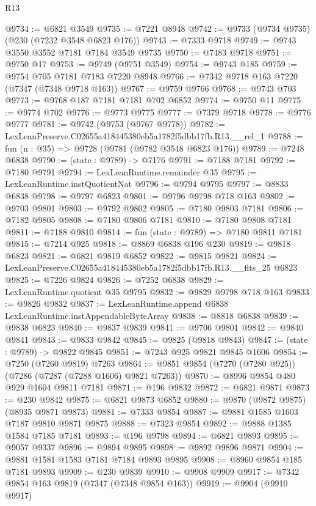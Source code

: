 \begin{lexlean}{R13}
\begin{coremodule}
@9734 := @6821 @3549
@9735 := @7221 @8948
@9742 := @9733 (@9734 @9735) (@230 (@7232 @3548 @6823 @176))
@9743 := @7333 @9718
@9749 := @9743 @3550 @3552 @7181 @7184 @3549 @9735
@9750 := @7483 @9718
@9751 := @9750 @17
@9753 := @9749 (@9751 @3549)
@9754 := @9743 @185
@9759 := @9754 @705 @7181 @7183 @7220 @8948
@9766 := @7342 @9718 @163 @7220 (@7347 (@7348 @9718 @163))
@9767 := @9759 @9766
@9768 := @9743 @703
@9773 := @9768 @187 @7181 @7181 @702 @6852
@9774 := @9750 @11
@9775 := @9774 @702
@9776 := @9773 @9775
@9777 := @7379 @9718
@9778 := @9776 @9777
@9781 := @9742 (@9753 (@9767 @9778))
@9782 := LexLeanPreserve.C02655a418445380eb5a1782f5dbb17fb.R13.__rel_1
@9788 := fun (n : @35) => @9728 (@9781 (@9782 @3548 @6823 @176))
@9789 := @7248 @6838
@9790 := (state : @9789) -> @7176
@9791 := @7188 @7181
@9792 := @7180 @9791
@9794 := LexLeanRuntime.remainder @35
@9795 := LexLeanRuntime.instQuotientNat
@9796 := @9794 @9795
@9797 := @8833 @6838
@9798 := @9797 @6823
@9801 := @9796 @9798 @718 @163
@9802 := @9703 @9801
@9803 := @9792 @9802
@9805 := @7180 @9803 @7181
@9806 := @7182 @9805
@9808 := @7180 @9806 @7181
@9810 := @7180 @9808 @7181
@9811 := @7188 @9810
@9814 := fun (state : @9789) => @7180 @9811 @7181
@9815 := @7214 @925
@9818 := @8869 @6838 @196 @230
@9819 := @9818 @6823
@9821 := @6821 @9819 @6852
@9822 := @9815 @9821
@9824 := LexLeanPreserve.C02655a418445380eb5a1782f5dbb17fb.R13.__fits_25 @6823
@9825 := @7226 @9824
@9826 := @7252 @6838
@9829 := LexLeanRuntime.quotient @35 @9795
@9832 := @9829 @9798 @718 @163
@9833 := @9826 @9832
@9837 := LexLeanRuntime.append @6838 LexLeanRuntime.instAppendableByteArray
@9838 := @8818 @6838
@9839 := @9838 @6823
@9840 := @9837 @9839
@9841 := @9706 @9801
@9842 := @9840 @9841
@9843 := @9833 @9842
@9845 := @9825 (@9818 @9843)
@9847 := (state : @9789) -> @9822 @9845
@9851 := @7243 @925 @9821 @9845 @1606
@9854 := @7250 (@7260 @9819) @7263
@9864 := @9851 @9854 (@7270 (@7280 @925)) (@7286 (@7287 (@7288 @1606) @9821 @7263))
@9870 := @8996 @9854 @480 @929 @1604 @9811 @7181
@9871 := @196 @9832
@9872 := @6821 @9871
@9873 := @230 @9842
@9875 := @6821 @9873 @6852
@9880 := @9870 (@9872 @9875) (@8935 @9871 @9873)
@9881 := @7333 @9854
@9887 := @9881 @1585 @1603 @7187 @9810 @9871 @9875
@9888 := @7323 @9854
@9892 := @9888 @1385 @1584 @7185 @7181
@9893 := @196 @9798
@9894 := @6821 @9893
@9895 := @9057 @9337
@9896 := @9894 @9895
@9898 := @9892 @9896 @9871
@9904 := @9881 @1581 @1583 @7181 @7184 @9893 @9895
@9908 := @8960 @9854 @185 @7181 @9893
@9909 := @230 @9839
@9910 := @9908 @9909
@9917 := @7342 @9854 @163 @9819 (@7347 (@7348 @9854 @163))
@9919 := @9904 (@9910 @9917)

\end{coremodule}
\end{lexlean}

